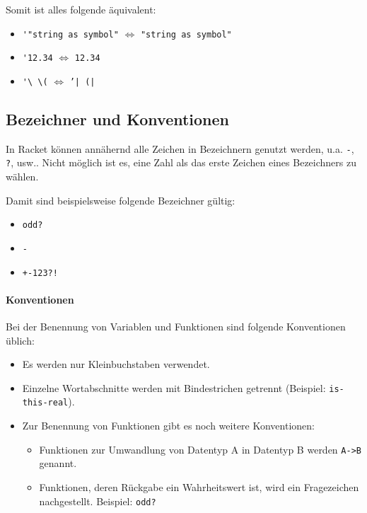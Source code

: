 		Somit ist alles folgende äquivalent:
		\begin{itemize}
			\item \lstinline[language = Racket]|'"string as symbol"| \(\iff\) \lstinline[language = Racket]|"string as symbol"|
			\item \lstinline[language = Racket]|'12.34| \(\iff\) \lstinline[language = Racket]|12.34|
			\item \lstinline[language = Racket]|'\ \(| \(\iff\) \texttt{'| (|}
		\end{itemize}

\subsection{Bezeichner und Konventionen}

	In Racket können annähernd alle Zeichen in Bezeichnern genutzt werden, u.a. \texttt{-}, \texttt{?}, usw.. Nicht möglich ist es, eine Zahl als das erste Zeichen eines Bezeichners zu wählen.
	
	Damit sind beispielsweise folgende Bezeichner gültig:
	\begin{itemize}
		\item \texttt{odd?}
		\item \texttt{-}
		\item \texttt{+-123?!}
	\end{itemize}

	\paragraph{Konventionen}
		Bei der Benennung von Variablen und Funktionen sind folgende Konventionen üblich:
		\begin{itemize}
			\item Es werden nur Kleinbuchstaben verwendet.
			\item Einzelne Wortabschnitte werden mit Bindestrichen getrennt (Beispiel: \texttt{is-this-real}).
			\item Zur Benennung von Funktionen gibt es noch weitere Konventionen:
				\begin{itemize}
					\item Funktionen zur Umwandlung von Datentyp A in Datentyp B werden \texttt{A->B} genannt.
					\item Funktionen, deren Rückgabe ein Wahrheitswert ist, wird ein Fragezeichen nachgestellt. Beispiel: \texttt{odd?}
				\end{itemize}
		\end{itemize}

